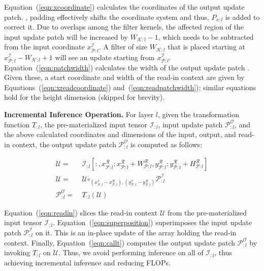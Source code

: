 Equation~(\ref{eqn:xcoordinate}) calculates the coordinates of the output update patch.
, padding effectively shifts the coordinate system and thus, $P_{x:l}$ is added to correct it.
Due to overlaps among the filter kernels, the affected region of the input update patch  will be increased by $W_{\mathcal{K}:l}-1$, which needs to be subtracted from the input coordinate $x^\mathcal{I}_{\mathcal{P}:l}$.
A filter of size $W_{\mathcal{K}:l}$ that is placed starting at $x^\mathcal{I}_{\mathcal{P}:l} - W_{\mathcal{K}:l} + 1$ will see an update starting from $x^\mathcal{I}_{\mathcal{P}:l}$.
Equation~(\ref{eqn:patchwidth}) calculates the width of the output update patch .
Given these, a start coordinate and width of the read-in context are given by Equations~(\ref{eqn:xreadcoordinate}) and~(\ref{eqn:readpatchwidth}); similar equations hold for the height dimension (skipped for brevity).


\vspace{2mm}
\noindent \textbf{Incremental Inference Operation.}
For layer $l$, given the transformation function $T_{:l}$, the pre-materialized input tensor $\mathcal{I}_{:l}$, input update patch $\mathcal{P}^\mathcal{O}_{:l}$, and the above calculated coordinates and dimensions of the input, output, and read-in context, the output update patch $\mathcal{P}^\mathcal{O}_{:l}$ is computed as follows:

\vspace{-2mm}
\begin{align}
\label{eqn:readin}
\mathcal{U} =&~ \mathcal{I}_{:l}[:,x^\mathcal{R}_{\mathcal{P}:l}:x^\mathcal{R}_{\mathcal{P}:l}+W^\mathcal{R}_{\mathcal{P}:l}, y^\mathcal{R}_{\mathcal{P}:l}: y^\mathcal{R}_{\mathcal{P}:l}+ H^\mathcal{R}_{\mathcal{P}:l}]\\
\label{eqn:superposition}
\mathcal{U} =&~ \mathcal{U} \bm\circ_{(x^\mathcal{I}_{\mathcal{P}:l}-x^\mathcal{R}_{\mathcal{P}:l}),(y^\mathcal{I}_{\mathcal{P}:l}-y^\mathcal{R}_{\mathcal{P}:l})} \mathcal{P}^{\mathcal{I}}_{:l}\\
\label{eqn:callt}
\mathcal{P}^\mathcal{O}_{:l} =&~ T_{:l}(\mathcal{U})
\end{align}

Equation~(\ref{eqn:readin}) slices the read-in context $\mathcal{U}$ from the pre-materialized input tensor $\mathcal{I}_{:l}$. Equation~(\ref{eqn:superposition}) superimposes the input update patch $\mathcal{P}^\mathcal{I}_{:l}$ on it. This is an in-place update of the array holding the read-in context. Finally, Equation~(\ref{eqn:callt}) computes the output update patch $\mathcal{P}^{\mathcal{O}}_{:l}$ by invoking $T_{:l}$ on $\mathcal{U}$. Thus, we avoid performing inference on all of $\mathcal{I}_{:l}$, thus achieving incremental inference and reducing FLOPs.


